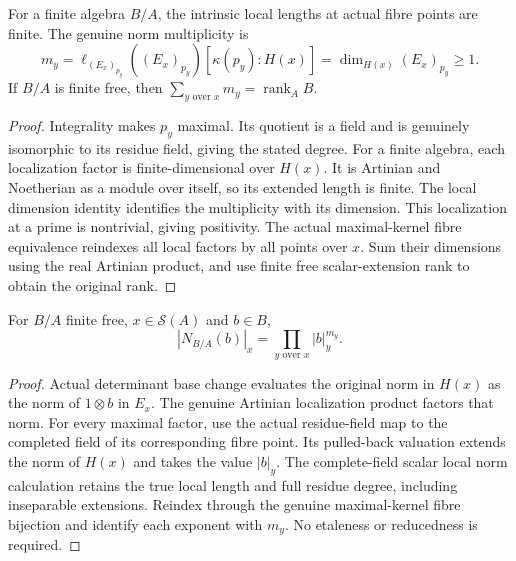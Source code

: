 \begin{theorem}
\label{spectrum:nonetale-fibre-multiplicities}
\leanok
{}
For a finite algebra $B/A$, the intrinsic local lengths at actual fibre
points are finite. The genuine norm multiplicity is
\[
 m_y=\ell_{(E_x)_{p_y}}((E_x)_{p_y})[\kappa(p_y):H(x)]
     =\dim_{H(x)}(E_x)_{p_y}\geq1.
\]
If $B/A$ is finite free, then $\sum_{y\text{ over }x}m_y=\operatorname{rank}_AB$.
\end{theorem}
\begin{proof}
Integrality makes $p_y$ maximal. Its quotient is a field and is genuinely
isomorphic to its residue field, giving the stated degree. For a finite
algebra, each localization factor is finite-dimensional over $H(x)$.
It is Artinian and Noetherian as a module over itself, so its extended length
is finite. The local dimension identity identifies the multiplicity with
its dimension. This localization at a prime is nontrivial, giving positivity.
The actual maximal-kernel fibre equivalence reindexes all local factors by
all points over $x$. Sum their dimensions using the real Artinian product,
and use finite free scalar-extension rank to obtain the original rank.
\end{proof}

\begin{theorem}
\label{spectrum:finite-free-scalar-norm}
\leanok
{}
For $B/A$ finite free, $x\in\mathcal S(A)$ and $b\in B$,
\[
 |N_{B/A}(b)|_x=\prod_{y\text{ over }x}|b|_y^{m_y}.
\]
\end{theorem}
\begin{proof}
Actual determinant base change evaluates the original norm in $H(x)$
as the norm of $1\otimes b$ in $E_x$. The genuine Artinian localization
product factors that norm. For every maximal factor, use the actual
residue-field map to the completed field of its corresponding fibre point.
Its pulled-back valuation extends the norm of $H(x)$ and takes the value
$|b|_y$. The complete-field scalar local norm calculation retains the true
local length and full residue degree, including inseparable extensions.
Reindex through the genuine maximal-kernel fibre bijection and identify each
exponent with $m_y$. No etaleness or reducedness is required.
\end{proof}

